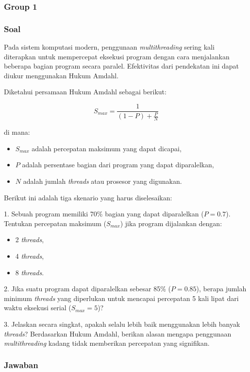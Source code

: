 \documentclass[12pt]{article}
\begin{document}
\subsubsection{Group 1}
\subsubsection*{Soal}

Pada sistem komputasi modern, penggunaan \textit{multithreading} sering kali diterapkan untuk mempercepat eksekusi program dengan cara menjalankan beberapa bagian program secara paralel. Efektivitas dari pendekatan ini dapat diukur menggunakan Hukum Amdahl. 

Diketahui persamaan Hukum Amdahl sebagai berikut:

\[
S_{max} = \frac{1}{(1 - P) + \frac{P}{N}}
\]

di mana:
\begin{itemize}
    \item \(S_{max}\) adalah percepatan maksimum yang dapat dicapai,
    \item \(P\) adalah persentase bagian dari program yang dapat diparalelkan,
    \item \(N\) adalah jumlah \textit{threads} atau prosesor yang digunakan.
\end{itemize}

Berikut ini adalah tiga skenario yang harus diselesaikan:

1. Sebuah program memiliki 70\% bagian yang dapat diparalelkan (\(P = 0.7\)). Tentukan percepatan maksimum (\(S_{max}\)) jika program dijalankan dengan:
\begin{itemize}
    \item 2 \textit{threads},
    \item 4 \textit{threads},
    \item 8 \textit{threads}.
\end{itemize}

2. Jika suatu program dapat diparalelkan sebesar 85\% (\(P = 0.85\)), berapa jumlah minimum \textit{threads} yang diperlukan untuk mencapai percepatan 5 kali lipat dari waktu eksekusi serial (\(S_{max} = 5\))?

3. Jelaskan secara singkat, apakah selalu lebih baik menggunakan lebih banyak \textit{threads}? Berdasarkan Hukum Amdahl, berikan alasan mengapa penggunaan \textit{multithreading} kadang tidak memberikan percepatan yang signifikan.

\subsubsection*{Jawaban}
\end{document}
